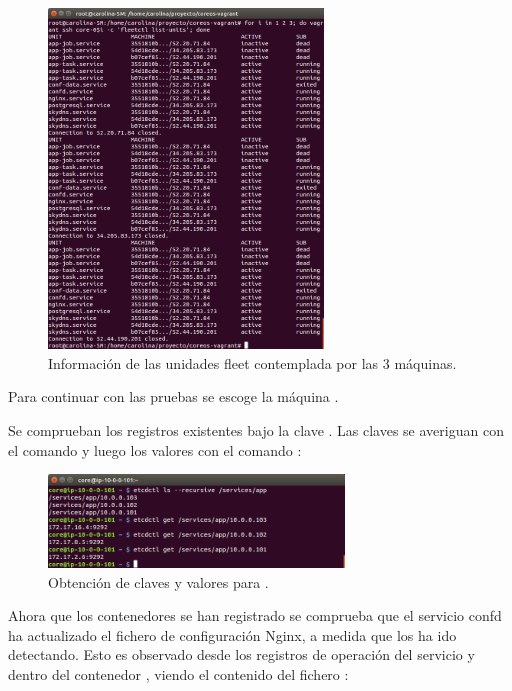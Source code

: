 \begin{figure}[H]
\centering
\includegraphics[width=0.65\textwidth]{images/figures/units-confd.png}
\caption{Información de las unidades fleet contemplada por las 3 máquinas.}
\end{figure}

Para continuar con las pruebas se escoge la máquina .

Se comprueban los registros existentes bajo la clave . Las claves se averiguan con el comando  y luego los valores con el comando :

\begin{figure}[H]
\centering
\includegraphics[width=0.7\textwidth]{images/figures/recursive-confd.png}
\caption{Obtención de claves y valores para .}
\end{figure}

Ahora que los contenedores  se han registrado se comprueba que el servicio confd ha actualizado el fichero de configuración Nginx, a medida que los ha ido detectando. Esto es observado desde los registros de operación del servicio  y dentro del contenedor , viendo el contenido del fichero :

